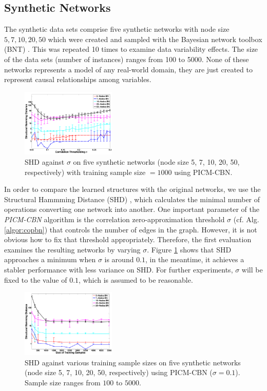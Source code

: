 \documentclass{article}
\begin{document}
\subsection{Synthetic Networks}
The synthetic data sets comprise five
synthetic networks with node size $5, 7, 10, 20, 50$ which were created and
sampled with the Bayesian network toolbox (BNT) \cite{bnt}. This was 
repeated 10 times to examine data variability effects.
The size of the data sets (number of instances) ranges from  100 to 5000.
%
None of these 
networks represents a model of any real-world domain, 
 they are just created to represent causal relationships among variables. 
%
\begin{figure}[H]
\centering
\includegraphics[width=0.4\textwidth]{Figures/plotsall/shd-alpha-errb}
\caption{SHD against $\sigma$ on five synthetic networks (node size 5, 7, 10, 20, 50, respectively) with training sample size  $ = 1000$ using PICM-CBN.}
\label{fig:shdAlphaResult}
\end{figure} \vspace{-0.2in}
In order to compare the learned structures with the original networks, we use the Structural  Hammming Distance (SHD) \cite{AcidCampos}, which calculates the minimal number of operations converting one network into another. 
One important parameter of the \textit{PICM-CBN} algorithm is the correlation zero-approximation threshold $\sigma$ (cf. Alg. \ref{algor:copbn})
that controls the number of edges in the graph. However, it is not obvious how to fix that threshold appropriately.
Therefore, the first evaluation examines the resulting networks by varying $\sigma$.
Figure \ref{fig:shdAlphaResult} shows that SHD approaches a 
minimum when $\sigma$ is around $0.1$, in the meantime, it achieves a stabler performance with less variance on SHD. For further experiments, $\sigma$ will be
fixed to the value of $0.1$, which is assumed to be reasonable.
\begin{figure}[H]
\centering
\includegraphics[width=0.4\textwidth]{Figures/plotsall/shd-samplesize-errb}
\caption{SHD against various training sample sizes on five synthetic networks (node size 5, 7, 10, 20, 50, respectively) using PICM-CBN ($\sigma = 0.1$). Sample size ranges from $100$ to $5000$.}
\label{fig:shdSampleResult}
\end{figure} 
\end{document}
